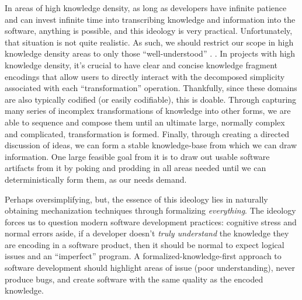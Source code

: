 In areas of high knowledge density, as long as developers have infinite patience
and can invest infinite time into transcribing knowledge and information into
the software, anything is possible, and this ideology is very practical.
Unfortunately, that situation is not quite realistic. As such, we should
restrict our scope in high knowledge density areas to only those
``well-understood'' \cite{well-understood}. . In
projects with high knowledge density, it's crucial to have clear and concise
knowledge fragment encodings that allow users to directly interact with the
decomposed simplicity associated with each ``transformation'' operation.
Thankfully, since these domains are also typically codified (or easily
codifiable), this is doable. Through capturing many series of incomplex
transformations of knowledge into other forms, we are able to sequence and
compose them until an ultimate large, normally complex and complicated,
transformation is formed. Finally, through creating a directed discussion of
ideas, we can form a stable knowledge-base from which we can draw information.
One large feasible goal from it is to draw out usable software artifacts from it
by poking and prodding in all areas needed until we can deterministically form
them, as our needs demand.

Perhaps oversimplifying, but, the essence of this ideology
lies in naturally obtaining mechanization techniques through formalizing
\textit{everything}. The ideology forces us to question modern software
development practices: cognitive stress and normal errors aside, if a developer
doesn't \textit{truly understand} the knowledge they are encoding in a software
product, then it should be normal to expect logical issues and an ``imperfect''
program. A formalized-knowledge-first approach to software development should
highlight areas of issue (poor understanding), never produce bugs, and create
software with the same quality as the encoded knowledge.

